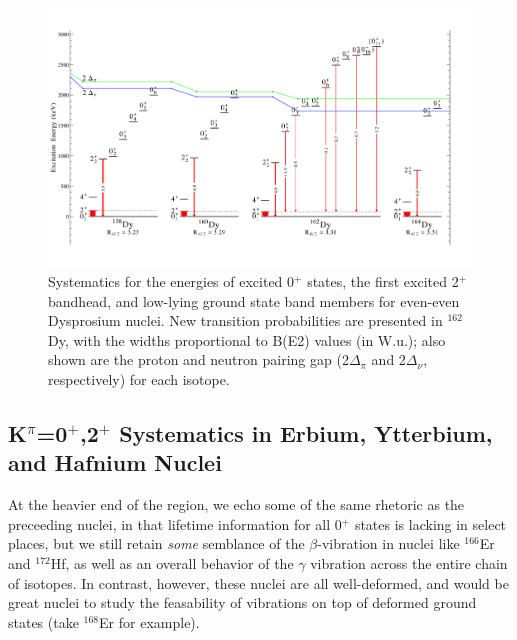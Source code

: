 \begin{landscape}
\begin{figure}[ht] 
\begin{center}
\includegraphics[height=0.8\textheight]{figures/SciDraw_DySystematics.pdf}
\caption{Systematics for the energies of excited 0$^+$ states, the first excited 2$^+$ bandhead, and low-lying ground state band members for even-even Dysprosium nuclei. New transition probabilities are presented in $^{162}$Dy, with the widths proportional to B(E2) values (in W.u.); also shown are the proton and neutron pairing gap (2$\Delta_\pi$ and 2$\Delta_\nu$, respectively) for each isotope. \label{fig:DySystematics}}
\end{center}
\end{figure}
\end{landscape}

\subsection{K$^\pi$=0$^+$,2$^+$ Systematics in Erbium, Ytterbium, and Hafnium Nuclei}
At the heavier end of the region, we echo some of the same rhetoric as the preceeding nuclei, in that lifetime information for all 0$^+$ states is lacking in select places, but we still retain \textit{some} semblance of the $\beta$-vibration in nuclei like $^{166}$Er and $^{172}$Hf, as well as an overall behavior of the $\gamma$ vibration across the entire chain of isotopes. In contrast, however, these nuclei are all well-deformed, and would be great nuclei to study the feasability of vibrations on top of deformed ground states (take $^{168}$Er for example).

